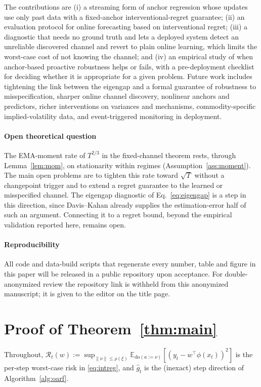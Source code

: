\documentclass[authoryear,preprint,12pt]{elsarticle}
\theoremstyle{plain}
\theoremstyle{remark}
\newcommand{\E}{\mathbb{E}}
\newcommand{\doop}{\mathrm{do}}
\begin{document}
The contributions are (i) a
streaming form of anchor regression whose updates use only past data with a fixed-anchor interventional-regret
guarantee; (ii) an evaluation protocol for online forecasting based on
interventional regret; (iii) a diagnostic
that needs no ground truth and lets a deployed system detect an unreliable discovered
channel and revert to plain online learning, which limits the worst-case cost of not
knowing the channel; and (iv) an empirical study of when anchor-based proactive
robustness helps or fails, with a pre-deployment checklist for deciding whether it is
appropriate for a given problem. Future work includes tightening the link between the
eigengap and a formal guarantee of robustness to misspecification, sharper online
channel discovery, nonlinear anchors and predictors, richer interventions on variances
and mechanisms, commodity-specific implied-volatility data, and event-triggered
monitoring in deployment.

\paragraph{Open theoretical question} The EMA-moment rate of $T^{2/3}$ in the
fixed-channel theorem rests, through Lemma~\ref{lem:mom}, on stationarity within regimes
(Assumption~\ref{ass:moment}). The main open problems are to tighten this rate toward
$\sqrt{T}$ without a changepoint trigger and to extend a regret guarantee to the
learned or misspecified channel. The eigengap diagnostic of Eq.~\eqref{eq:eigengap} is
a step in this direction, since Davis--Kahan already supplies the estimation-error half
of such an argument. Connecting it to a regret bound, beyond the empirical validation
reported here, remains open.

\paragraph{Reproducibility} All code and data-build scripts that regenerate every
number, table and figure in this paper will be released in a public repository upon
acceptance. For double-anonymized review the repository link is withheld from this
anonymized manuscript; it is given to the editor on the title page.
\appendix

\section{Proof of Theorem~\ref{thm:main}}\label{app:proof}
Throughout, $\mathcal{R}_t(w):=\sup_{\|\nu\|\le\rho(\xi)}\E_{\doop(a:=\nu)}
[(y_t-w^\top\phi(x_t))^2]$ is the per-step worst-case risk in \eqref{eq:intreg}, and
$\hat g_t$ is the (inexact) step direction of Algorithm~\ref{alg:oarf}.
\end{document}

